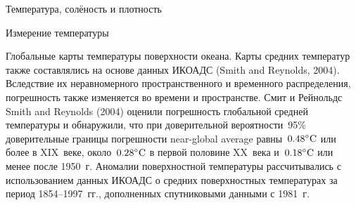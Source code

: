 \begin{chapter}{Температура, солёность и плотность}
\begin{section}{Измерение температуры}
\begin{paragraph}{Глобальные карты температуры поверхности океана.}
Карты средних температур также составлялись на основе данных 
ИКОАДС (Smith and Reynolds, 2004). Вследствие их неравномерного 
пространственного и временного распределения, погрешность также изменяется
во времени и пространстве. Смит и Рейнольдс Smith and Reynolds (2004) 
оценили погрешность глобальной средней температуры и обнаружили, что
при доверительной вероятности~95\% доверительные границы погрешности
near-global average равны~${0.48}^\circ\mbox{C}$ или более в XIX~веке, 
около~${0.28}^\circ\mbox{C}$ в первой половине XX~века и~${0.18}^\circ\mbox{C}$ 
или менее после 1950~г. Аномалии поверхностной температуры рассчитывались 
с использованием данных ИКОАДС о средних поверхностных температурах 
за период 1854--1997~гг., дополненных спутниковыми данными с 1981~г.
%
\end{paragraph}
\end{section}


\end{chapter}
